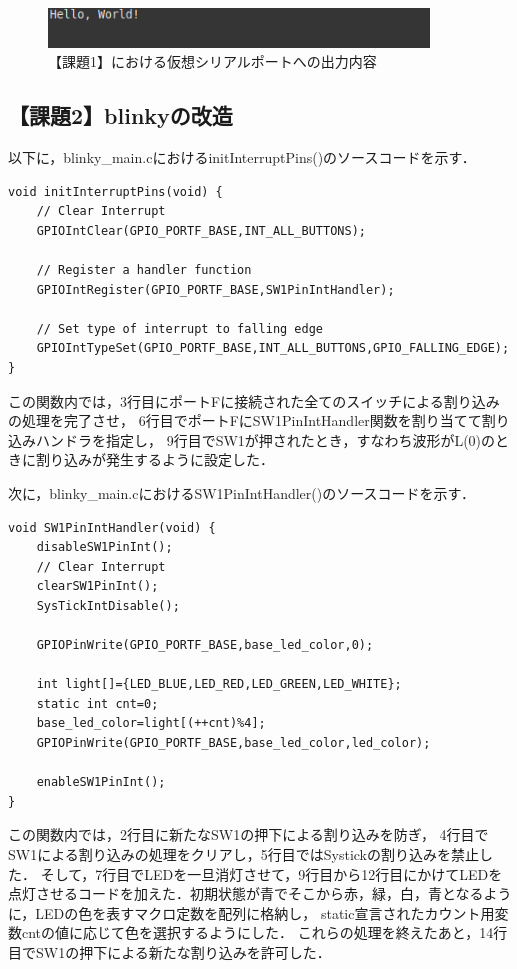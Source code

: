 \documentclass{jlreq}
\begin{document}
\begin{figure}
  \centering
  \includegraphics[width=0.9\textwidth]{Hello.png}
  \caption{【課題1】における仮想シリアルポートへの出力内容}
  \label{fig:Hello_World}
\end{figure}

\subsection{【課題2】blinkyの改造}
以下に，blinky\_main.cにおけるinitInterruptPins()のソースコードを示す．

\begin{lstlisting}[label=a2initInt,caption={【課題2】におけるinitInterruptPins関数}]
void initInterruptPins(void) {
    // Clear Interrupt
    GPIOIntClear(GPIO_PORTF_BASE,INT_ALL_BUTTONS);

    // Register a handler function
    GPIOIntRegister(GPIO_PORTF_BASE,SW1PinIntHandler);

    // Set type of interrupt to falling edge
    GPIOIntTypeSet(GPIO_PORTF_BASE,INT_ALL_BUTTONS,GPIO_FALLING_EDGE);
}
\end{lstlisting}

この関数内では，3行目にポートFに接続された全てのスイッチによる割り込みの処理を完了させ，
6行目でポートFにSW1PinIntHandler関数を割り当てて割り込みハンドラを指定し，
9行目でSW1が押されたとき，すなわち波形がL(0)のときに割り込みが発生するように設定した．

次に，blinky\_main.cにおけるSW1PinIntHandler()のソースコードを示す．

\begin{lstlisting}[label=a2SW1Int,caption={【課題2】におけるSW1PinIntHandler関数}]
void SW1PinIntHandler(void) {
    disableSW1PinInt();
    // Clear Interrupt
    clearSW1PinInt();
    SysTickIntDisable();

    GPIOPinWrite(GPIO_PORTF_BASE,base_led_color,0);

    int light[]={LED_BLUE,LED_RED,LED_GREEN,LED_WHITE};
    static int cnt=0;
    base_led_color=light[(++cnt)%4];
    GPIOPinWrite(GPIO_PORTF_BASE,base_led_color,led_color);

    enableSW1PinInt();
}
\end{lstlisting}

この関数内では，2行目に新たなSW1の押下による割り込みを防ぎ，
4行目でSW1による割り込みの処理をクリアし，5行目ではSystickの割り込みを禁止した．
そして，7行目でLEDを一旦消灯させて，9行目から12行目にかけてLEDを点灯させるコードを加えた．初期状態が青でそこから赤，緑，白，青となるように，LEDの色を表すマクロ定数を配列に格納し，
static宣言されたカウント用変数cntの値に応じて色を選択するようにした．
これらの処理を終えたあと，14行目でSW1の押下による新たな割り込みを許可した．
\end{document}
